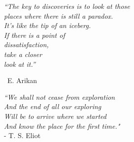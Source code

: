 
\begin{center}
\emph{``The key to discoveries is to look at those\\
 places where there is still a paradox.\\
It’s like the tip of an iceberg.\\
If there is a point of \\
dissatisfaction, \\
take a closer \\
look at it.'' \\}
 \end{center}
\begin{center}
~E. Arikan
 \end{center}

\newpage
\vfill
\begin{centering}
\emph{``We shall not cease from exploration\\
And the end of all our exploring \\
Will be to arrive where we started \\
And know the place for the first time."\\} 
- T. S.	Eliot
\end{centering}
\vfill